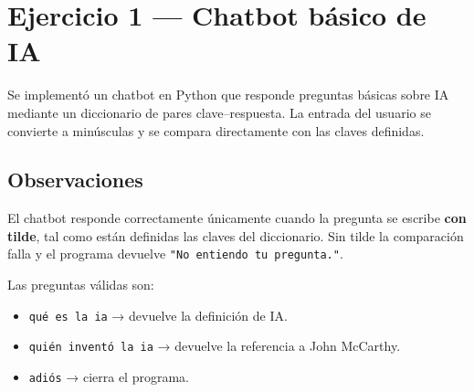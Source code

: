 \documentclass[../Main_Include.tex]{subfiles}
\begin{document}
%
%
%

\newcommand{\tituloinforme}{Fundamentos de la Inteligencia Artificial — Laboratorio 1}

\section{Ejercicio 1 — Chatbot básico de IA}

Se implementó un chatbot en Python que responde preguntas básicas sobre IA
mediante un diccionario de pares clave--respuesta. La entrada del usuario
se convierte a minúsculas y se compara directamente con las claves definidas.

\subsection*{Observaciones}

El chatbot responde correctamente únicamente cuando la pregunta se escribe
\textbf{con tilde}, tal como están definidas las claves del diccionario.
Sin tilde la comparación falla y el programa devuelve
\texttt{"No entiendo tu pregunta."}.

Las preguntas válidas son:

\begin{itemize}[leftmargin=1.5cm, itemsep=2pt]
    \item \texttt{qué es la ia} → devuelve la definición de IA.
    \item \texttt{quién inventó la ia} → devuelve la referencia a John McCarthy.
    \item \texttt{adiós} → cierra el programa.
\end{itemize}

\end{document}
